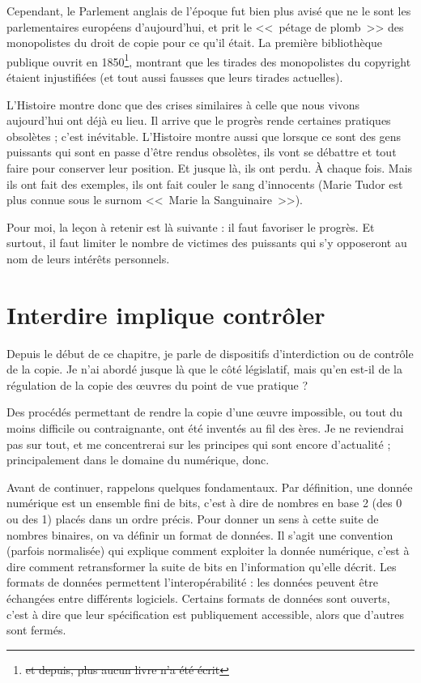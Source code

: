 Cependant, le Parlement anglais de l'époque fut bien plus avisé que ne le sont les parlementaires européens d'aujourd'hui, et prit le <<~pétage de plomb~>> des monopolistes du droit de copie pour ce qu'il était. 
La première bibliothèque publique ouvrit en 1850\footnote{\sout{et depuis, plus aucun livre n'a été écrit}}, montrant que les tirades des monopolistes du copyright étaient injustifiées (et tout aussi fausses que leurs tirades actuelles).

L'Histoire montre donc que des crises similaires à celle que nous vivons aujourd'hui ont déjà eu lieu.
Il arrive que le progrès rende certaines pratiques obsolètes ; c'est inévitable.
L'Histoire montre aussi que lorsque ce sont des gens puissants qui sont en passe d'être rendus obsolètes, ils vont se débattre et tout faire pour conserver leur position.
Et jusque là, ils ont perdu.
À chaque fois.
Mais ils ont fait des exemples, ils ont fait couler le sang d'innocents (Marie Tudor est plus connue sous le surnom <<~Marie la Sanguinaire~>>).

Pour moi, la leçon à retenir est là suivante : il faut favoriser le progrès.
Et surtout, il faut limiter le nombre de victimes des puissants qui s'y opposeront au nom de leurs intérêts personnels.

\section{Interdire implique contrôler} %
\label{drm}

Depuis le début de ce chapitre, je parle de dispositifs d'interdiction ou de contrôle de la copie.
Je n'ai abordé jusque là que le côté législatif, mais qu'en est-il de la régulation de la copie des œuvres du point de vue pratique ?

Des procédés permettant de rendre la copie d'une œuvre impossible, ou tout du moins difficile ou contraignante, ont été inventés au fil des ères.
Je ne reviendrai pas sur tout, et me concentrerai sur les principes qui sont encore d'actualité ; principalement dans le domaine du numérique, donc.

Avant de continuer, rappelons quelques fondamentaux.
Par définition, une donnée numérique est un ensemble fini de bits, c'est à dire de nombres en base 2 (des 0 ou des 1) placés dans un ordre précis.
Pour donner un sens à cette suite de nombres binaires, on va définir un format de données.
Il s'agit une convention (parfois normalisée) qui explique comment exploiter la donnée numérique, c'est à dire comment retransformer la suite de bits en l'information qu'elle décrit.
Les formats de données permettent l'interopérabilité : les données peuvent être échangées entre différents logiciels.
Certains formats de données sont ouverts, c'est à dire que leur spécification est publiquement accessible, alors que d'autres sont fermés.

